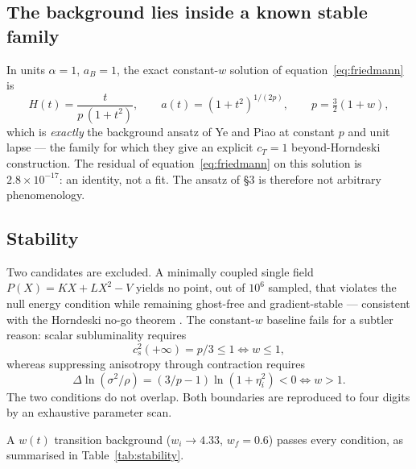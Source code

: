 \documentclass[a4paper,11pt]{article}
\begin{document}
\subsection{The background lies inside a known stable family}

In units $\alpha=1$, $a_B=1$, the exact constant-$w$ solution of equation~\eqref{eq:friedmann} is
\begin{equation}
H(t)=\frac{t}{p\,(1+t^{2})},\qquad a(t)=(1+t^{2})^{1/(2p)},\qquad p=\tfrac32(1+w),
\end{equation}
which is \emph{exactly} the background ansatz of Ye and Piao \cite{YePiao} at constant $p$ and unit lapse --- the family for which they give an explicit $c_T=1$ beyond-Horndeski construction. The residual of equation~\eqref{eq:friedmann} on this solution is $2.8\times10^{-17}$: an identity, not a fit. The ansatz of \S3 is therefore not arbitrary phenomenology.

\subsection{Stability}

Two candidates are excluded. A minimally coupled single field $P(X)=KX+LX^{2}-V$ yields no point, out of $10^{6}$ sampled, that violates the null energy condition while remaining ghost-free and gradient-stable --- consistent with the Horndeski no-go theorem \cite{Kobayashi}. The constant-$w$ baseline fails for a subtler reason: scalar subluminality requires
\begin{equation}
c_s^{2}(+\infty)=p/3\le1 \iff w\le1,
\end{equation}
whereas suppressing anisotropy through contraction requires
\begin{equation}
\Delta\ln(\sigma^{2}/\rho)=(3/p-1)\ln(1+\eta_i^{2})<0 \iff w>1 .
\end{equation}
The two conditions do not overlap. Both boundaries are reproduced to four digits by an exhaustive parameter scan.

A $w(t)$ transition background ($w_i\to4.33$, $w_f=0.6$) passes every condition, as summarised in Table~\ref{tab:stability}.
\end{document}
